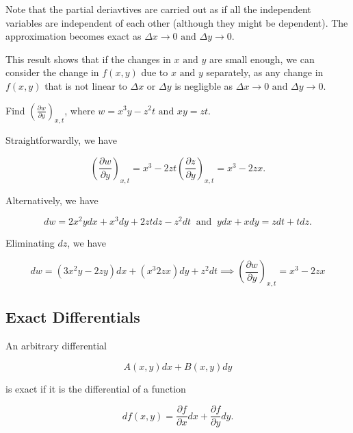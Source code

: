 \documentclass[english,a4paper,12pt]{report}
\begin{document}
Note that the partial deriavtives are carried out as if all the independent variables are independent of each other (although they might be dependent). The approximation becomes exact as \(\Delta x \rightarrow  0 \text { and }  \Delta y \rightarrow 0\).  

This result shows that if the changes in \(x \text { and } y\) are small enough, we can consider the change in \(f(x,y)\) due to \(x \text { and } y\) separately, as any change in \(f(x,y)\) that is not linear to \(\Delta x \text { or } \Delta y\) is negligble as \(\Delta x \rightarrow 0 \text { and } \Delta y \rightarrow 0\).     

{Find \(\displaystyle \left( \frac{\partial w}{\partial y}  \right)_{x,t} \), where \(w = x^3 y-z^2t \text { and } xy = zt\).  }
{Straightforwardly, we have

\begin{equation}
	\left( \frac{\partial w}{\partial y}  \right)_{x,t} = x^3 -2zt \left( \frac{\partial z}{\partial y}  \right)_{x,t} = x^3 - 2zx.  
\end{equation}

Alternatively, we have

\begin{equation}
	dw = 2x^2ydx+x^3 dy+2zt dz-z^2dt ~\text { and }~ ydx+xdy=zdt+tdz.
\end{equation}

Eliminating \(dz\), we have 

\begin{equation}
	dw = (3x^2y-2zy)dx + (x^3 2zx)dy+z^2dt \implies \left( \frac{\partial w}{\partial y}  \right)_{x,t} = x^3 -2zx
\end{equation}




} 



\subsection{Exact Differentials}

An arbitrary differential 

\begin{equation}
    A(x,y) dx + B(x,y) dy
\end{equation}

is exact if it is the differential of a function 

\begin{equation}
    df(x,y) = \frac{\partial f}{\partial x} dx + \frac{\partial f}{\partial y} dy.
\end{equation}
\end{document}
